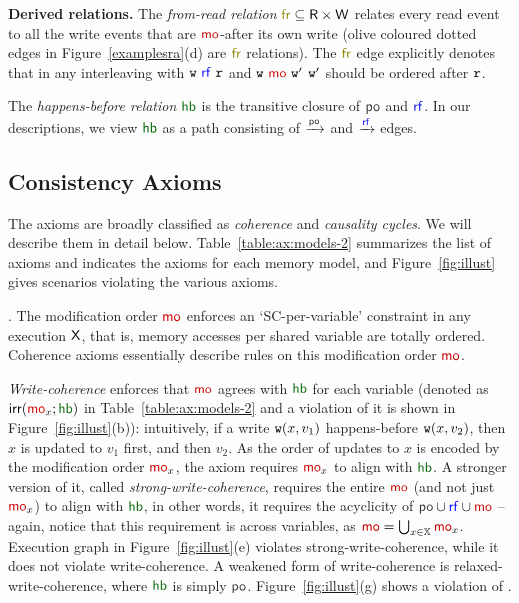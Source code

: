 \noindent \textbf{Derived relations.} The \emph{from-read relation} $\fr \subseteq \R \times \W$ relates every read event to all the write events that are $\mo$-after its own write (olive coloured dotted edges in Figure~\ref{examplesra}(d) are $\fr$ relations). The $\fr$ edge explicitly denotes that in any interleaving with $\wt~\rf~\rd$ and $\wt~\mo~\wt'$ $\mathtt{w}'$ should be ordered after $\mathtt{r}$.

The \emph{happens-before relation} $\hb$ is the transitive closure of $\po$ and $\rf$. In our descriptions, we view $\hb$ as a path consisting of $\xra{\po}$ and $\xra{\rf}$ edges.


 
 \subsection{Consistency Axioms}\label{subsec:consistency_axioms}
The axioms are broadly classified as  
\emph{coherence} and \emph{causality cycles}. We will describe them in detail below. Table~\ref{table:ax:models-2} summarizes the list of axioms and indicates the axioms for each memory model, and Figure~\ref{fig:illust} gives scenarios violating the various axioms.



. The modification order $\mo$ enforces an `SC-per-variable' constraint in any execution $\mathsf{\color{black}X}$, that is, memory accesses per shared variable are  totally ordered.  Coherence axioms essentially describe rules on this modification order  $\mo$.
 
\emph{Write-coherence} enforces that $\mo$ agrees with $\hb$ for each variable (denoted as $\irr(\mo_x;\hb)$ in Table~\ref{table:ax:models-2} and a violation of it is shown in Figure~\ref{fig:illust}(b)): intuitively, if a write $\mathtt{w}(x, v_1)$ happens-before $\mathtt{w}(x, v_2)$, then $x$ is updated to $v_1$ first, and then $v_2$. As the order of updates to $x$ is encoded by the modification order $\mo_x$, the axiom requires $\mo_x$ to align with $\hb$.  
A stronger version of it, called \emph{strong-write-coherence}, requires the entire $\mo$ (and not just $\mo_x$) to align with $\hb$, in other words, it requires the acyclicity of $\po \cup \rf \cup \mo$ -- again, notice that this requirement is across variables, as $\mo=\bigcup_{x \in \varset}\mo_x$. Execution graph in Figure~\ref{fig:illust}(e) violates strong-write-coherence, while it does not violate write-coherence. A weakened form of write-coherence is
relaxed-write-coherence, where $\hb$ is simply $\po$. Figure~\ref{fig:illust}(g) shows a violation of \RlxWCoh{}.

